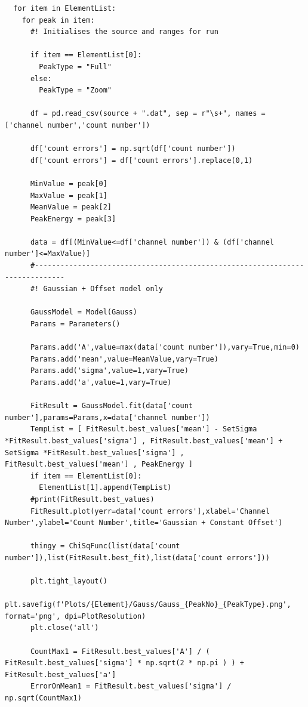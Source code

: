 \documentclass[11pt,a4paper]{article}
\begin{document}
\begin{verbatim}
  for item in ElementList:
    for peak in item:
      #! Initialises the source and ranges for run

      if item == ElementList[0]:
        PeakType = "Full"
      else:
        PeakType = "Zoom"

      df = pd.read_csv(source + ".dat", sep = r"\s+", names = ['channel number','count number'])

      df['count errors'] = np.sqrt(df['count number'])
      df['count errors'] = df['count errors'].replace(0,1)

      MinValue = peak[0]
      MaxValue = peak[1]
      MeanValue = peak[2]
      PeakEnergy = peak[3]

      data = df[(MinValue<=df['channel number']) & (df['channel number']<=MaxValue)]
      #-----------------------------------------------------------------------------
      #! Gaussian + Offset model only

      GaussModel = Model(Gauss)
      Params = Parameters()

      Params.add('A',value=max(data['count number']),vary=True,min=0)
      Params.add('mean',value=MeanValue,vary=True)
      Params.add('sigma',value=1,vary=True)
      Params.add('a',value=1,vary=True)

      FitResult = GaussModel.fit(data['count number'],params=Params,x=data['channel number'])
      TempList = [ FitResult.best_values['mean'] - SetSigma *FitResult.best_values['sigma'] , FitResult.best_values['mean'] + SetSigma *FitResult.best_values['sigma'] , FitResult.best_values['mean'] , PeakEnergy ] 
      if item == ElementList[0]:
        ElementList[1].append(TempList)
      #print(FitResult.best_values)
      FitResult.plot(yerr=data['count errors'],xlabel='Channel Number',ylabel='Count Number',title='Gaussian + Constant Offset')

      thingy = ChiSqFunc(list(data['count number']),list(FitResult.best_fit),list(data['count errors']))

      plt.tight_layout()
      plt.savefig(f'Plots/{Element}/Gauss/Gauss_{PeakNo}_{PeakType}.png', format='png', dpi=PlotResolution)
      plt.close('all')

      CountMax1 = FitResult.best_values['A'] / ( FitResult.best_values['sigma'] * np.sqrt(2 * np.pi ) ) + FitResult.best_values['a']
      ErrorOnMean1 = FitResult.best_values['sigma'] / np.sqrt(CountMax1)


\end{verbatim}
\end{document}
